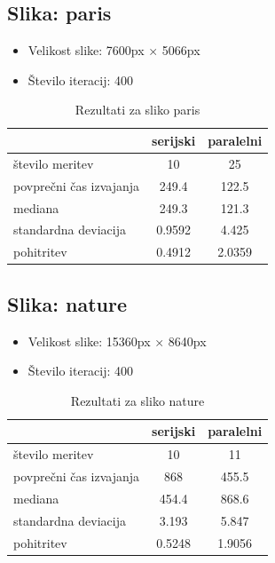 \documentclass[11pt,a4paper]{article}
\begin{document}
\subsection{Slika: paris}

\begin{itemize}
\item Velikost slike: 7600px × 5066px
\item Število iteracij: 400
\end{itemize}

\begin{table}[htbp]
\begin{center}
\begin{tabular}{|l|c|c|}
	\hline
		& serijski & paralelni  \\
	\hline
	število meritev & 10  & 25\\
	\hline
	povprečni čas izvajanja & 249.4 & 122.5\\
    \hline
    mediana& 249.3 & 121.3  \\
    \hline
    	standardna deviacija & 0.9592  & 4.425\\
    \hline
    pohitritev & 0.4912 & 2.0359 \\
    \hline
\end{tabular}
\end{center}

\caption{Rezultati za sliko paris}
\label{table:ta}
\end{table}

\pagebreak

\subsection{Slika: nature}
\begin{itemize}
\item Velikost slike: 15360px × 8640px
\item Število iteracij: 400
\end{itemize}

\begin{table}[htbp]
\begin{center}
\begin{tabular}{|l|c|c|}
	\hline
		& serijski & paralelni  \\
	\hline
	število meritev & 10  & 11\\
	\hline
	povprečni čas izvajanja & 868 & 455.5\\
    \hline
    mediana & 454.4 & 868.6 \\
    \hline
    	standardna deviacija & 3.193  & 5.847\\
    \hline
    pohitritev & 0.5248 & 1.9056 \\
    \hline
\end{tabular}
\end{center}

\caption{Rezultati za sliko nature}
\label{table:ta}
\end{table}
\end{document}
